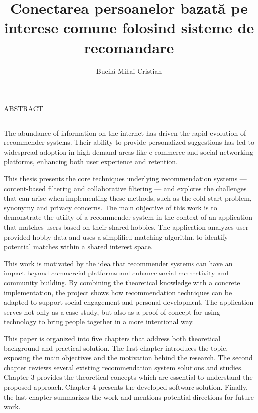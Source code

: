 \documentclass[12pt]{report}
\begin{document}
\title{Conectarea persoanelor bazată pe interese comune folosind sisteme de recomandare}					   
\author{Bucilă Mihai-Cristian}											
				
\maketitle


\newpage
\thispagestyle{empty}
\mbox{}
\newpage
{} 

\cleardoublepage
ABSTRACT
\vspace{0.5cm}	
\hrule
\vspace{0.5cm}	

\par
The abundance of information on the internet has driven the rapid evolution of recommender systems.
Their ability to provide personalized suggestions has led to widespread adoption in high-demand areas like e-commerce and social networking platforms, enhancing both user experience and retention.
\par
This thesis presents the core techniques underlying recommendation systems --- content-based filtering and collaborative filtering --- and explores the challenges that can arise when implementing these methods, such as the cold start problem, synonymy and privacy concerns.
The main objective of this work is to demonstrate the utility of a recommender system in the context of an application that matches users based on their shared hobbies.
The application analyzes user-provided hobby data and uses a simplified matching algorithm to identify potential matches within a shared interest space.
\par
This work is motivated by the idea that recommender systems can have an impact beyond commercial platforms and enhance social connectivity and community building.
By combining the theoretical knowledge with a concrete implementation, the project shows how recommendation techniques can be adapted to support social engagement and personal development.
The application serves not only as a case study, but also as a proof of concept for using technology to bring people together in a more intentional way.
\par
This paper is organized into five chapters that address both theoretical background and practical solution.
The first chapter introduces the topic, exposing the main objectives and the motivation behind the research.
The second chapter reviews several existing recommendation system solutions and studies.
Chapter 3 provides the theoretical concepts which are essential to understand the proposed approach.
Chapter 4 presents the developed software solution.
Finally, the last chapter summarizes the work and mentions potential directions for future work.
\end{document}
